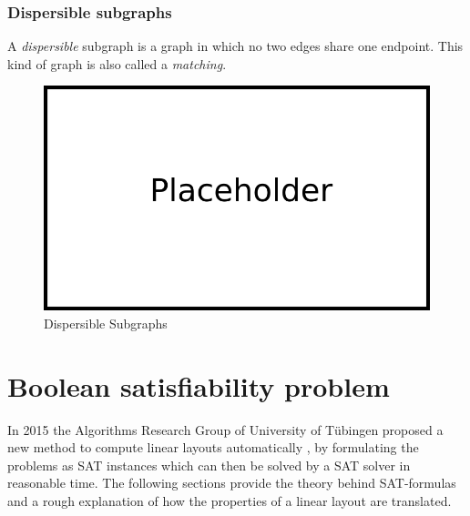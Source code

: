 \subsubsection{Dispersible subgraphs}
A \textit{dispersible} subgraph is a graph in which no two edges share one endpoint. This kind of graph is also called a \textit{matching}. 
\begin{figure}[h!]
\begin{center}
\includegraphics[width=1\textwidth]{figures/Platzhalter.png}
\caption{Dispersible Subgraphs}
\label{img:plzhltr}
\end{center}
\end{figure} 
\newpage
\section{Boolean satisfiability problem}
In 2015 the Algorithms Research Group of University of Tübingen proposed a new method to compute linear layouts automatically \cite{Bekos2015TheBE}, by formulating the problems as SAT instances which can then be solved by a SAT solver in reasonable time.
The following sections provide the theory behind SAT-formulas and a rough explanation of how the properties of a linear layout are translated.
